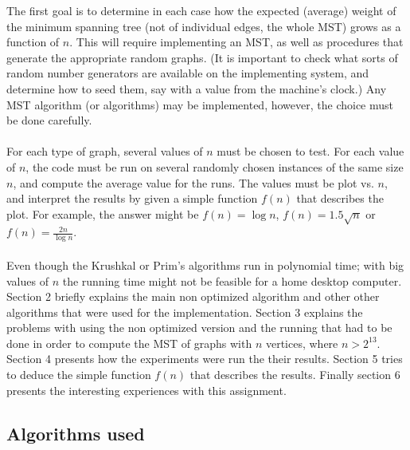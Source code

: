 \documentclass[tikz, 12pt]{scrartcl}
\begin{document}
The first goal is to determine in each case how the expected (average) weight of the minimum spanning tree (not of individual edges, the whole MST) grows as a function of $n$. This will require implementing an MST, as well as procedures that generate the appropriate random graphs. (It is important to check what sorts of random number generators are available on the implementing system, and determine how to seed them, say with a value from the machine's clock.) Any MST algorithm (or algorithms) may be implemented, however, the choice must be done carefully.\\
\\
For each type of graph, several values of $n$ must be chosen to test. For each value of $n$, the code must be run on several randomly chosen instances of the same size $n$, and compute the average value for the runs. The values must be plot  vs. $n$, and interpret the results by given a simple function $f(n)$ that describes the plot. For example, the answer might be $f(n) = \log n$, $f(n) = 1.5 \sqrt{n}$ or $f(n) = \frac{2n}{\log n}$. \\
\\
Even though the Krushkal or Prim's algorithms run in polynomial time; with big values of $n$ the running time might not be feasible for a home desktop computer. Section 2 briefly explains the main non optimized algorithm and other other algorithms that were used for the implementation. Section 3 explains the problems with using the non optimized version and the running that had to be done in order to compute the MST of graphs with $n$ vertices, where $n > 2^13$. Section 4 presents how the experiments were run the their results. Section 5  tries to deduce the simple function $f(n)$ that describes the results. Finally section 6 presents the interesting experiences with this assignment.

\subsection{Algorithms used}
\end{document}
